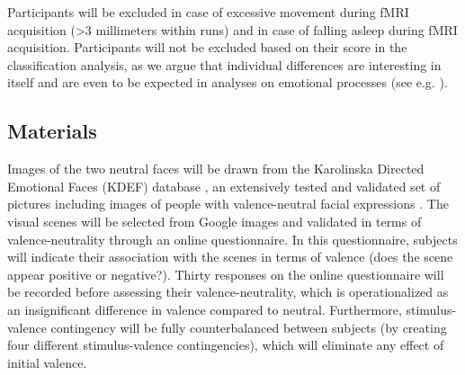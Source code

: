 \documentclass[12pt,a4paper]{article}\usepackage[]{graphicx}\usepackage[]{color}
\begin{document}
Participants will be excluded in case of excessive movement during fMRI acquisition (\textgreater 3 millimeters within runs) and in case of falling asleep during fMRI acquisition. Participants will not be excluded based on their score in the classification analysis, as we argue that individual differences are interesting in itself and are even to be expected in analyses on emotional processes (see e.g. \citealp{oosterwijk2015}). 


\subsection{Materials}

Images of the two neutral faces will be drawn from the Karolinska Directed Emotional Faces (KDEF) database \citep{KDEF}, an extensively tested and validated set of pictures including images of people with valence-neutral facial expressions \citep{goeleven2008}. The visual scenes will be selected from Google images and validated in terms of valence-neutrality through an online questionnaire. In this questionnaire, subjects will indicate their association with the scenes in terms of valence (does the scene appear positive or negative?). Thirty responses on the online questionnaire will be recorded before assessing their valence-neutrality, which is operationalized as an insignificant difference in valence compared to neutral. Furthermore, stimulus-valence contingency will be fully counterbalanced between subjects (by creating four different stimulus-valence contingencies), which will eliminate any effect of initial valence.
\end{document}
